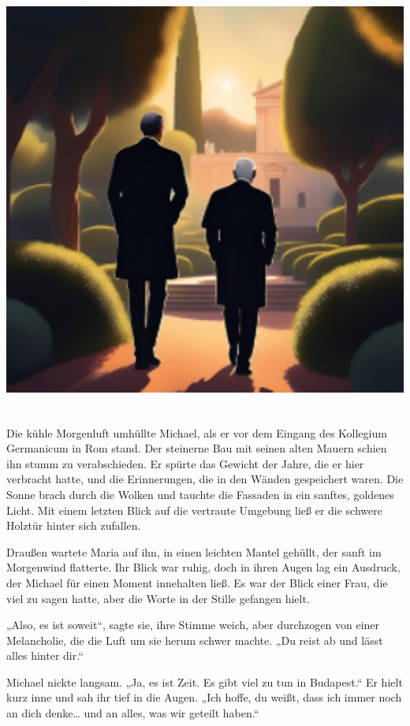 \documentclass[
]{article}
\begin{document}
\includegraphics[width=6in,height=5.58333in]{media/image1.png}

Die kühle Morgenluft umhüllte Michael, als er vor dem Eingang des
Kollegium Germanicum in Rom stand. Der steinerne Bau mit seinen alten
Mauern schien ihn stumm zu verabschieden. Er spürte das Gewicht der
Jahre, die er hier verbracht hatte, und die Erinnerungen, die in den
Wänden gespeichert waren. Die Sonne brach durch die Wolken und tauchte
die Fassaden in ein sanftes, goldenes Licht. Mit einem letzten Blick auf
die vertraute Umgebung ließ er die schwere Holztür hinter sich zufallen.

Draußen wartete Maria auf ihn, in einen leichten Mantel gehüllt, der
sanft im Morgenwind flatterte. Ihr Blick war ruhig, doch in ihren Augen
lag ein Ausdruck, der Michael für einen Moment innehalten ließ. Es war
der Blick einer Frau, die viel zu sagen hatte, aber die Worte in der
Stille gefangen hielt.

„Also, es ist soweit``, sagte sie, ihre Stimme weich, aber durchzogen
von einer Melancholie, die die Luft um sie herum schwer machte. „Du
reist ab und lässt alles hinter dir.``

Michael nickte langsam. „Ja, es ist Zeit. Es gibt viel zu tun in
Budapest.`` Er hielt kurz inne und sah ihr tief in die Augen. „Ich
hoffe, du weißt, dass ich immer noch an dich denke\ldots{} und an alles,
was wir geteilt haben.``
\end{document}
